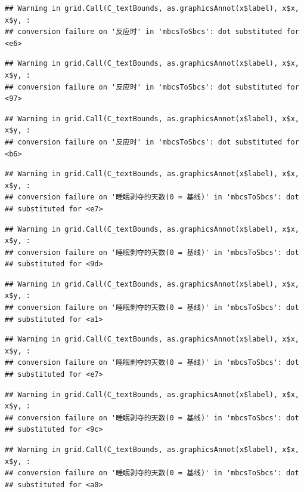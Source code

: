 \documentclass[
]{book}
\begin{document}
\begin{verbatim}
## Warning in grid.Call(C_textBounds, as.graphicsAnnot(x$label), x$x, x$y, :
## conversion failure on '反应时' in 'mbcsToSbcs': dot substituted for <e6>
\end{verbatim}

\begin{verbatim}
## Warning in grid.Call(C_textBounds, as.graphicsAnnot(x$label), x$x, x$y, :
## conversion failure on '反应时' in 'mbcsToSbcs': dot substituted for <97>
\end{verbatim}

\begin{verbatim}
## Warning in grid.Call(C_textBounds, as.graphicsAnnot(x$label), x$x, x$y, :
## conversion failure on '反应时' in 'mbcsToSbcs': dot substituted for <b6>
\end{verbatim}

\begin{verbatim}
## Warning in grid.Call(C_textBounds, as.graphicsAnnot(x$label), x$x, x$y, :
## conversion failure on '睡眠剥夺的天数(0 = 基线)' in 'mbcsToSbcs': dot
## substituted for <e7>
\end{verbatim}

\begin{verbatim}
## Warning in grid.Call(C_textBounds, as.graphicsAnnot(x$label), x$x, x$y, :
## conversion failure on '睡眠剥夺的天数(0 = 基线)' in 'mbcsToSbcs': dot
## substituted for <9d>
\end{verbatim}

\begin{verbatim}
## Warning in grid.Call(C_textBounds, as.graphicsAnnot(x$label), x$x, x$y, :
## conversion failure on '睡眠剥夺的天数(0 = 基线)' in 'mbcsToSbcs': dot
## substituted for <a1>
\end{verbatim}

\begin{verbatim}
## Warning in grid.Call(C_textBounds, as.graphicsAnnot(x$label), x$x, x$y, :
## conversion failure on '睡眠剥夺的天数(0 = 基线)' in 'mbcsToSbcs': dot
## substituted for <e7>
\end{verbatim}

\begin{verbatim}
## Warning in grid.Call(C_textBounds, as.graphicsAnnot(x$label), x$x, x$y, :
## conversion failure on '睡眠剥夺的天数(0 = 基线)' in 'mbcsToSbcs': dot
## substituted for <9c>
\end{verbatim}

\begin{verbatim}
## Warning in grid.Call(C_textBounds, as.graphicsAnnot(x$label), x$x, x$y, :
## conversion failure on '睡眠剥夺的天数(0 = 基线)' in 'mbcsToSbcs': dot
## substituted for <a0>
\end{verbatim}
\end{document}
